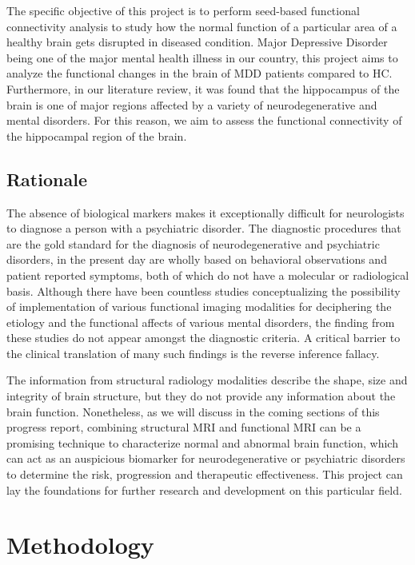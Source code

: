 \documentclass{article}
\begin{document}
The specific objective of this project is to perform seed-based
functional connectivity analysis to study how the normal function of a
particular area of a healthy brain gets disrupted in diseased
condition. Major Depressive Disorder being one of the major mental
health illness in our country, this project aims to analyze the
functional changes in the brain of MDD patients compared to HC.
Furthermore, in our literature review, it was found that the
hippocampus of the brain is one of major regions affected by a variety
of neurodegenerative and mental disorders. For this reason, we aim to
assess the functional connectivity of the hippocampal region of the
brain.

\subsection{Rationale}

The absence of biological markers makes it exceptionally difficult for
neurologists to diagnose a person with a psychiatric disorder. The
diagnostic procedures that are the gold standard for the diagnosis of
neurodegenerative and psychiatric disorders, in the present day are
wholly based on behavioral observations and patient reported symptoms,
both of which do not have a molecular or radiological basis. Although
there have been countless studies conceptualizing the possibility of
implementation of various functional imaging modalities for
deciphering the etiology and the functional affects of various mental
disorders, the finding from these studies do not appear amongst the
diagnostic criteria. A critical barrier to the clinical translation of
many such findings is the reverse inference fallacy.

The information from structural radiology modalities describe the
shape, size and integrity of brain structure, but they do not provide
any information about the brain function. Nonetheless, as we will
discuss in the coming sections of this progress report, combining
structural MRI and functional MRI can be a promising technique to
characterize normal and abnormal brain function, which can act as an
auspicious biomarker for neurodegenerative or psychiatric disorders to
determine the risk, progression and therapeutic effectiveness. This
project can lay the foundations for further research and development
on this particular field.

\section{Methodology}
\end{document}

